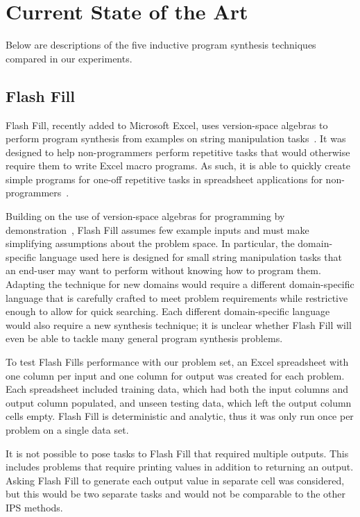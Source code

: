 \section{Current State of the Art}

Below are descriptions of the five inductive program synthesis techniques compared in our experiments.

\subsection{Flash Fill}

Flash Fill, recently added to Microsoft Excel, uses version-space algebras to perform program synthesis from examples on string manipulation tasks~\cite{Gulwani2011}. It was designed to help non-programmers perform repetitive tasks that would otherwise require them to write Excel macro programs. As such, it is able to quickly create simple programs for one-off repetitive tasks in spreadsheet applications for non-programmers~\cite{Gulwani:2012:SDM:2240236.2240260, harris2011spreadsheet, Singh:2012:LSS:2212351.2212356, singh2012synthesizing}. 

Building on the use of version-space algebras for programming by demonstration~\cite{lau2003programming}, Flash Fill assumes few example inputs and must make simplifying assumptions about the problem space. In particular, the domain-specific language used here is designed for small string manipulation tasks that an end-user may want to perform without knowing how to program them. Adapting the technique for new domains would require a different domain-specific language that is carefully crafted to meet problem requirements while restrictive enough to allow for quick searching. Each different domain-specific language would also require a new synthesis technique; it is unclear whether Flash Fill will even be able to tackle many general program synthesis problems.

To test Flash Fills performance with our problem set, an Excel spreadsheet with one column per input and one column for output was created for each problem. Each spreadsheet included training data, which had both the input columns and output column populated, and unseen testing data, which left the output column cells empty. Flash Fill is deterministic and analytic, thus it was only run once per problem on a single data set.

It is not possible to pose tasks to Flash Fill that required multiple outputs. This includes problems that require printing values in addition to returning an output. Asking Flash Fill to generate each output value in separate cell was considered, but this would be two separate tasks and would not be comparable to the other IPS methods.


